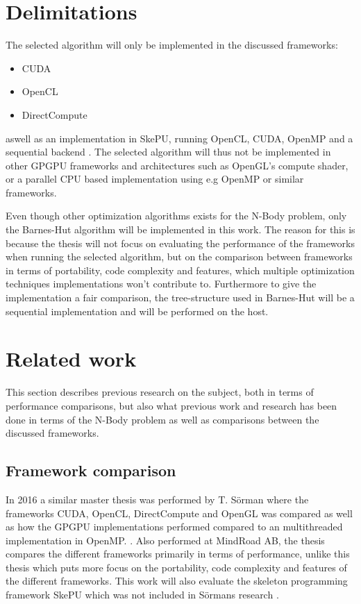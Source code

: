 \section{Delimitations}

The selected algorithm will only be implemented in the discussed frameworks:
\begin{itemize}
    \item CUDA
    \item OpenCL
    \item DirectCompute
\end{itemize}

\noindent aswell as an implementation in SkePU, running OpenCL, CUDA, OpenMP and a sequential backend \cite{enmyren2010skepu}. The selected algorithm will thus not be implemented in other GPGPU frameworks and architectures such as OpenGL's compute shader, or a parallel CPU based implementation using e.g OpenMP or similar frameworks.

Even though other optimization algorithms exists for the N-Body problem, only the Barnes-Hut algorithm will be implemented in this work. The reason for this is because the thesis will not focus on evaluating the performance of the frameworks when running the selected algorithm, but on the comparison between frameworks in terms of portability, code complexity and features, which multiple optimization techniques implementations won't contribute to. Furthermore to give the implementation a fair comparison, the tree-structure used in Barnes-Hut will be a sequential implementation and will be performed on the host.

\section{Related work}
This section describes previous research on the subject, both in terms of performance comparisons, but also what previous work and research has been done in terms of the N-Body problem as well as comparisons between the discussed frameworks.


\subsection{Framework comparison} \label{subsec:frameworkComparison}
In 2016 a similar master thesis was performed by T. Sörman where the frameworks CUDA, OpenCL, DirectCompute and OpenGL was compared as well as how the GPGPU implementations performed compared to an multithreaded implementation in OpenMP. \cite{Torbjorn}. Also performed at MindRoad AB, the thesis compares the different frameworks primarily in terms of performance, unlike this thesis which puts more focus on the portability, code complexity and features of the different frameworks. This work will also evaluate the skeleton programming framework SkePU which was not included in Sörmans research \cite{enmyren2010skepu}. 

